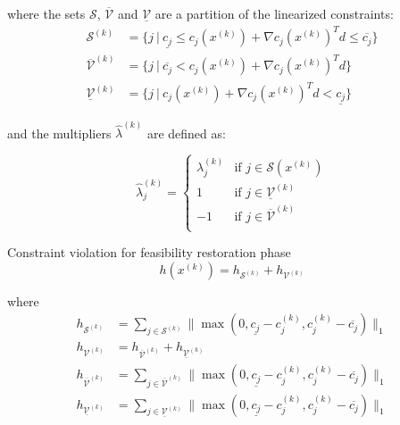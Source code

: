 where the sets $\mathcal{S}$, $\overline{\mathcal{V}}$ and $\underline{\mathcal{V}}$ are a partition of the linearized constraints:
\begin{align}
\mathcal{S}^{(k)} 				& = \{j ~|~ \underline{c_j} \le c_j(x^{(k)}) + \nabla c_j(x^{(k)})^T d \le \overline{c_j} \} \\
\overline{\mathcal{V}}^{(k)} 	& = \{j ~|~ \overline{c_j} < c_j(x^{(k)}) + \nabla c_j(x^{(k)})^T d \} \\
\underline{\mathcal{V}}^{(k)} 	& = \{j ~|~ c_j(x^{(k)}) + \nabla c_j(x^{(k)})^T d < \underline{c_j} \}
\end{align}

and the multipliers $\hat{\lambda}^{(k)}$ are defined as:

\begin{equation}
\hat{\lambda}_j^{(k)} =
\begin{cases}
\lambda_j^{(k)} & \text{if } j \in \mathcal{S}(x^{(k)}) \\
1				& \text{if } j \in \underline{\mathcal{V}}^{(k)} \\
-1				& \text{if } j \in \overline{\mathcal{V}}^{(k)} \\
\end{cases}
\end{equation}



Constraint violation for feasibility restoration phase
\begin{equation}
h(x^{(k)}) = h_{\mathcal{S}^{(k)}} + h_{\mathcal{V}^{(k)}}
\end{equation}

where
\begin{align}
h_{\mathcal{S}^{(k)}} & = \sum\limits_{j \in \mathcal{S}^{(k)}} \bigg\lVert \max(0, \underline{c_j} - c_j^{(k)}, c_j^{(k)} - \overline{c_j}) \bigg\rVert_1 \\
h_{\mathcal{V}^{(k)}} & = h_{\overline{\mathcal{V}}^{(k)}} + h_{\underline{\mathcal{V}}^{(k)}} \\
h_{\overline{\mathcal{V}}^{(k)}} & = \sum\limits_{j \in \overline{\mathcal{V}}^{(k)}} \bigg\lVert \max(0, \underline{c_j} - c_j^{(k)}, c_j^{(k)} - \overline{c_j}) \bigg\rVert_1 \\
h_{\underline{\mathcal{V}}^{(k)}} & = \sum\limits_{j \in \underline{\mathcal{V}}^{(k)}} \bigg\lVert \max(0, \underline{c_j} - c_j^{(k)}, c_j^{(k)} - \overline{c_j}) \bigg\rVert_1
\end{align}

